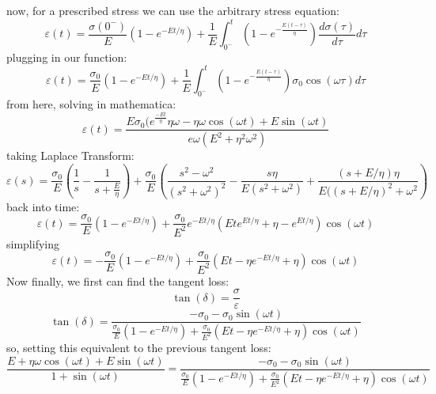 now, for a prescribed stress we can use the arbitrary stress equation:
\begin{equation}
    \varepsilon(t) = \frac{\sigma(0^-)}{E}(1-e^{-Et/\eta})+\frac{1}{E}\int_{0^-}^t (1-e^{-\frac{E(t-\tau)}{\eta}})\frac{d\sigma(\tau)}{d\tau}d\tau
\end{equation}
plugging in our function:
\begin{equation}
    \varepsilon(t) = \frac{\sigma_0}{E}(1-e^{-Et/\eta})+\frac{1}{E}\int_{0^-}^t (1-e^{-\frac{E(t-\tau)}{\eta}})\sigma_0\cos(\omega\tau)d\tau
\end{equation}
from here, solving in mathematica:
\begin{equation}
   \varepsilon(t)= \frac{E\sigma_0(e^{\frac{-Et}{\eta}}\eta \omega-\eta\omega\cos(\omega t)+E\sin(\omega t)}{e \omega(E^2 +\eta^2\omega^2)}
\end{equation}
taking Laplace Transform:
\begin{equation}
    \varepsilon(s) = \frac{\sigma_0}{E}(\frac{1}{s}-\frac{1}{s+\frac{E}{\eta}})+\frac{\sigma_0}{E}(\frac{s^2-\omega^2}{(s^2+\omega^2)^2}-\frac{s\eta}{E(s^2+\omega^2)}+\frac{(s+E/\eta)\eta}{E((s+E/\eta)^2+\omega^2})
\end{equation}
back into time:
\begin{equation}
    \varepsilon(t)=\frac{\sigma_0}{E}(1-e^{-Et/\eta})+\frac{\sigma_0}{E^2}e^{-Et/\eta}(Ete^{Et/\eta}+\eta-e^{Et/\eta})\cos(\omega t)
\end{equation}
simplifying
\begin{equation}
   \boxed{\varepsilon(t)=-\frac{\sigma_0}{E}(1-e^{-Et/\eta})+\frac{\sigma_0}{E^2}(Et-\eta e^{-Et/\eta}+\eta)\cos(\omega t)}
\end{equation}
Now finally, we first can find the tangent loss:
\begin{equation}
    \tan(\delta) = \frac{\sigma}{\varepsilon}
\end{equation}
\begin{equation}
    \tan(\delta) = \frac{-\sigma_0-\sigma_0\sin(\omega t)}{\frac{\sigma_0}{E}(1-e^{-Et/\eta})+\frac{\sigma_0}{E^2}(Et-\eta e^{-Et/\eta}+\eta)\cos(\omega t)}
\end{equation}
so, setting this equivalent to the previous tangent loss:
\begin{equation}
     \frac{E+\eta\omega \cos(\omega t)+E\sin(\omega t)}{1+\sin(\omega t)}= \frac{-\sigma_0-\sigma_0\sin(\omega t)}{\frac{\sigma_0}{E}(1-e^{-Et/\eta})+\frac{\sigma_0}{E^2}(Et-\eta e^{-Et/\eta}+\eta)\cos(\omega t)}
\end{equation}
